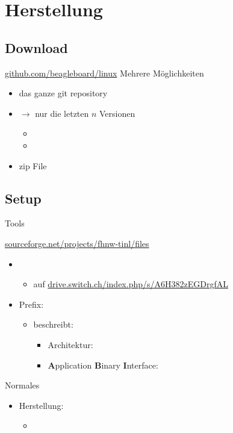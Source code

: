 \section{Herstellung}

\subsection{Download}
\begin{frame}{\url{github.com/beagleboard/linux}}
             {Mehrere Möglichkeiten}
 \begin{itemize}
  \item das ganze git repository
  \item {$\to$ \Large nur die letzten $n$ Versionen }
  \begin{itemize}
   \item {}
   \item {}
  \end{itemize}
  \item zip File 
 \end{itemize}
\end{frame}

\subsection{Setup}
\begin{frame}{Tools}%
 \begin{description}[toolchain]
 
  \item[toolchain] {\small \url{sourceforge.net/projects/fhnw-tinl/files}}
   \begin{itemize}
    \item {}
    \begin{itemize}
     \item auf \url{drive.switch.ch/index.php/s/A6H382zEGDrgfAL}
    \end{itemize}
    \item Prefix: 
    \begin{itemize}
     \item beschreibt:
     \begin{itemize}
      \item Architektur: 
      \item {\bf A}pplication {\bf B}inary {\bf I}nterface: 
     \end{itemize}
    \end{itemize}
    \end{itemize}
  \item[make] Normales 
  \begin{itemize}
   \item {} Herstellung:
   \begin{itemize}
    \item {}
   \end{itemize}
  \end{itemize}
 \end{description}
\end{frame}

